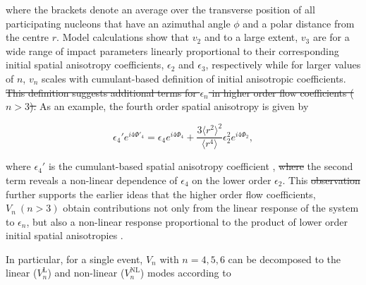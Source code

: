 \documentclass[ALICE,manyauthors]{cernphprep}
\providecommand{\DIFaddtex}[1]{{\protect\color{blue}\uwave{#1}}} %
\providecommand{\DIFdeltex}[1]{{\protect\color{red}\sout{#1}}}                      %
\providecommand{\DIFaddbegin}{} %
\providecommand{\DIFaddend}{} %
\providecommand{\DIFdelbegin}{} %
\providecommand{\DIFdelend}{} %
\providecommand{\DIFadd}[1]{\texorpdfstring{\DIFaddtex{#1}}{#1}} %
\providecommand{\DIFdel}[1]{\texorpdfstring{\DIFdeltex{#1}}{}} %
\newcommand{\DIFscaledelfig}{0.5}
\newlength{\DIFdelgraphicswidth} %
\newlength{\DIFdelgraphicsheight} %
\newcommand{\DIFaddincludegraphics}[2][]{{\color{blue}\fbox{\DIFOincludegraphics[#1]{#2}}}} %
\newcommand{\DIFdelincludegraphics}[2][]{%
\sbox{\DIFdelgraphicsbox}{\DIFOincludegraphics[#1]{#2}}%
\settoboxwidth{\DIFdelgraphicswidth}{\DIFdelgraphicsbox} %
\settoboxtotalheight{\DIFdelgraphicsheight}{\DIFdelgraphicsbox} %
\scalebox{\DIFscaledelfig}{%
\parbox[b]{\DIFdelgraphicswidth}{\usebox{\DIFdelgraphicsbox}\\[-\baselineskip] \rule{\DIFdelgraphicswidth}{0em}}\llap{\resizebox{\DIFdelgraphicswidth}{\DIFdelgraphicsheight}{%
\setlength{\unitlength}{\DIFdelgraphicswidth}%
\begin{picture}(1,1)%
\thicklines\linethickness{2pt} %
{\color[rgb]{1,0,0}\put(0,0){\framebox(1,1){}}}%
{\color[rgb]{1,0,0}\put(0,0){\line( 1,1){1}}}%
{\color[rgb]{1,0,0}\put(0,1){\line(1,-1){1}}}%
\end{picture}%
}\hspace*{3pt}}} %
} %
\DeclareRobustCommand{\DIFaddbegin}{\DIFOaddbegin \let\includegraphics\DIFaddincludegraphics} %
\DeclareRobustCommand{\DIFaddend}{\DIFOaddend \let\includegraphics\DIFOincludegraphics} %
\DeclareRobustCommand{\DIFdelbegin}{\DIFOdelbegin \let\includegraphics\DIFdelincludegraphics} %
\DeclareRobustCommand{\DIFdelend}{\DIFOaddend \let\includegraphics\DIFOincludegraphics} %
\begin{document}
where the brackets denote an average over the transverse position of all participating nucleons that have an azimuthal angle $\phi$ and a polar distance from the centre $r$. Model calculations show that $v_2$ and to a large extent, $v_3$ are for a wide range of impact parameters linearly proportional to their corresponding initial spatial anisotropy coefficients, $\epsilon_{2}$ and $\epsilon_{3}$, respectively \cite{Alver:2010gr} while for larger values of $n$, $v_{n}$ scales with \DIFaddbegin \DIFadd{a }\DIFaddend cumulant-based definition of initial anisotropic coefficients. \DIFdelbegin \DIFdel{This definition suggests additional terms for $\epsilon_{n}$ in higher order flow coefficients ($n>3$). }\DIFdelend %
As an example, the fourth order spatial anisotropy is given by 


\begin{equation}
\epsilon_{4}'e^{i4\Phi'_4} = \epsilon_{4}e^{i4\Phi_4}  + \frac{3\langle{r^{2}}\rangle^{2}}{\langle r^4\rangle}\epsilon_{2}^{2}e^{i4\Phi_2},
\label{Eq:epsilonnprime}
\end{equation}

where $\epsilon_{4}'$ is the cumulant-based spatial anisotropy coefficient \cite{Teaney:2013dta,Qian:2017ier}, \DIFdelbegin \DIFdel{where }\DIFdelend \DIFaddbegin \DIFadd{and }\DIFaddend the second term \DIFaddbegin \DIFadd{in the right hand side }\DIFaddend reveals a non-linear dependence of \DIFdelbegin \DIFdel{$\epsilon_{4}$ }\DIFdelend \DIFaddbegin \DIFadd{$\epsilon_{4}'$ }\DIFaddend on the lower order $\epsilon_{2}$. This \DIFdelbegin \DIFdel{observation }\DIFdelend further supports the earlier ideas that the higher order flow coefficients, $V_n~(n > 3)$ obtain contributions not only from the linear response of the system to $\epsilon_{n}$, but also a non-linear response proportional to the product of lower order initial spatial anisotropies \cite{Bhalerao:2014xra,Yan:2015jma}. 

In particular, for a single event, $V_n$ with $n=4,5,6$ can be decomposed to the linear ($V_{n}^{\mathrm{L}} $) and non-linear ($ V_{n}^{\mathrm{NL}}$) modes according to%
\end{document}
